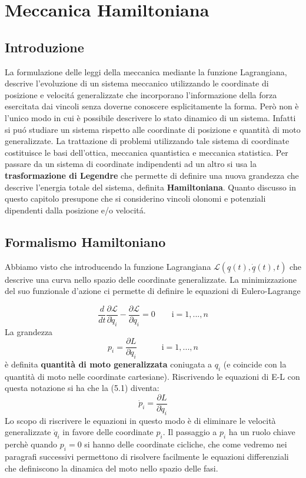 \setcounter{chapter}{4}
\chapter{Meccanica Hamiltoniana}
\section{Introduzione}
La formulazione delle leggi della meccanica mediante la funzione Lagrangiana, descrive l'evoluzione di un sistema meccanico utilizzando le coordinate di posizione e velocit\'{a} generalizzate che incorporano l'informazione della forza esercitata dai vincoli senza doverne conoscere esplicitamente la forma. Per\`{o} non \`{e} l'unico modo in cui \`{e} possibile descrivere lo stato dinamico di un sistema. Infatti si pu\'{o} studiare un sistema rispetto alle coordinate di posizione e quantit\`{a} di moto generalizzate. La trattazione di problemi utilizzando tale sistema di coordinate costituisce le basi dell'ottica, meccanica quantistica e meccanica statistica. Per passare da un sistema di coordinate indipendenti ad un altro si usa la \textbf{trasformazione di Legendre} che permette di definire una nuova grandezza che descrive l'energia totale del sistema, definita \textbf{Hamiltoniana}. Quanto discusso in questo capitolo presupone che si considerino vincoli olonomi e potenziali dipendenti dalla posizione e/o velocit\'{a}.

\section{Formalismo Hamiltoniano}

Abbiamo visto che introducendo la funzione Lagrangiana $\mathcal{L}(\underline{q}(t),\underline{\dot q}(t),t)$ che descrive una curva nello spazio delle coordinate generalizzate. La minimizzazione del suo funzionale d'azione ci permette di definire le equazioni di Eulero-Lagrange

\begin{equation}
	\frac{d}{d t} \frac{\partial \mathcal{L}}{\partial \dot{q}_{i}}-\frac{\partial \mathcal{L}}{\partial q_i}=0 \quad \quad \text{i} = 1,...,n
\end{equation} 	
La grandezza
\begin{equation}
	p_i=\frac{\partial L}{\partial \dot{q}_i} \quad \quad \quad \text{i} = 1,...,n
\end{equation}
\`{e} definita \textbf{quantit\`{a} di moto generalizzata} coniugata a $q_i$ (e coincide con la quantit\`{a} di moto nelle coordinate cartesiane). Riscrivendo le equazioni di E-L con questa notazione si ha che la (5.1) diventa:
\begin{equation}
	\dot p_i = \frac{\partial L}{\partial \dot{q}_i}
\end{equation}
Lo scopo di riscrivere le equazioni in questo modo \`{e} di eliminare le velocit\`{a} generalizzate $\dot q_i$ in favore delle coordinate $p_i$. Il passaggio a $p_i$ ha un ruolo chiave perch\`{e} quando $p_i = 0$ si hanno delle coordinate cicliche, che come vedremo nei paragrafi successivi permettono di risolvere facilmente le equazioni differenziali che definiscono la dinamica del moto nello spazio delle fasi.
